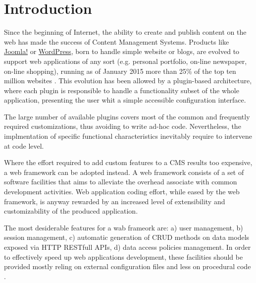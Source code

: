 \section{Introduction}\label{sec:introduction}

Since the beginning of Internet, the ability to create and publish content on the web has made the success of Content Management Systems. Products like \href{http://www.joomla.org/}{Joomla!} or \href{https://wordpress.org/}{WordPress}, born to handle simple website or blogs, are evolved to support web applications of any sort (e.g.  personal portfolio, on-line newspaper, on-line shopping), running as of January 2015 more than 25\% of the top ten million websites \cite{usage-cms}. This evolution has been allowed by a plugin-based architecture, where each plugin is responsible to handle a functionality subset of the whole application, presenting the user whit a simple accessible configuration interface.

The large number of available plugins covers most of the common and frequently required customizations, thus avoiding to write ad-hoc code. Nevertheless, the implmentation of specific functional characteristics inevitably require to intervene at code level.

Where the effort required to add custom features to a CMS results too expensive, a web framework can be adopted instead. A web framework consists of a set of software facilities that aims to alleviate the overhead associate with common development activities. Web application coding effort, while eased by the web framework, is anyway rewarded by an increased level of extensibility and customizability of the produced application.

The most desiderable features for a wab frameork are: a) user management, b) session management, c) automatic generation of CRUD methods on data models exposed via HTTP RESTfull APIs, d) data access policies management. In order to effectively speed up web applications development, these facilities should be provided mostly reling on external configuration files and less on procedural code \cite{6859693}.


